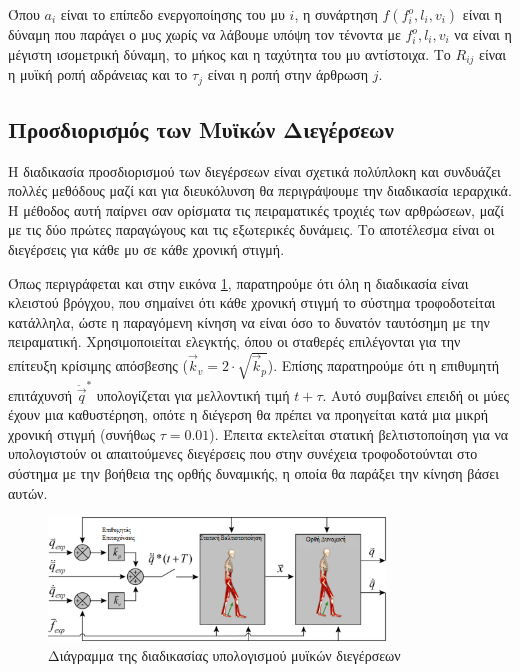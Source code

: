 Όπου $a_i$ είναι το επίπεδο ενεργοποίησης του μυ $i$, η συνάρτηση $f(f^{o}_{i}, l_{i}, v_{i})$ είναι η δύναμη που παράγει ο μυς χωρίς να λάβουμε υπόψη τον τένοντα με $f^{o}_{i}, l_{i}, v_{i}$ να είναι η μέγιστη ισομετρική δύναμη, το μήκος και η ταχύτητα του μυ αντίστοιχα. Το $R_{ij}$ είναι η μυϊκή ροπή αδράνειας και το $\tau_{j}$ είναι η ροπή στην άρθρωση $j$.

\subsection{Προσδιορισμός των Μυϊκών Διεγέρσεων}

Η διαδικασία προσδιορισμού των διεγέρσεων είναι σχετικά πολύπλοκη και συνδυάζει πολλές μεθόδους μαζί και για διευκόλυνση θα περιγράψουμε την διαδικασία ιεραρχικά. Η μέθοδος αυτή παίρνει σαν ορίσματα τις πειραματικές τροχιές των αρθρώσεων, μαζί με τις δύο πρώτες παραγώγους και τις εξωτερικές δυνάμεις. Το αποτέλεσμα είναι οι διεγέρσεις για κάθε μυ σε κάθε χρονική στιγμή.

Όπως περιγράφεται και στην εικόνα \ref{fig:cmc-diagram}, παρατηρούμε ότι όλη η διαδικασία είναι κλειστού βρόγχου, που σημαίνει ότι κάθε χρονική στιγμή το σύστημα τροφοδοτείται κατάλληλα, ώστε η παραγόμενη κίνηση να είναι όσο το δυνατόν ταυτόσημη με την πειραματική. Χρησιμοποιείται  ελεγκτής, όπου οι σταθερές επιλέγονται για την επίτευξη κρίσιμης απόσβεσης ($\overrightarrow{k}_v = 2 \cdot \sqrt{\overrightarrow{k}_p}$). Επίσης παρατηρούμε ότι η επιθυμητή επιτάχυνσή $\ddot{\overrightarrow{q}}^{*}$ υπολογίζεται για μελλοντική τιμή $t + \tau $. Αυτό συμβαίνει επειδή οι μύες έχουν μια καθυστέρηση, οπότε η διέγερση θα πρέπει να προηγείται κατά μια μικρή χρονική στιγμή (συνήθως $\tau = 0.01$). Έπειτα εκτελείται στατική βελτιστοποίηση για να υπολογιστούν οι απαιτούμενες διεγέρσεις που στην συνέχεια τροφοδοτούνται στο σύστημα με την βοήθεια της ορθής δυναμικής, η οποία θα παράξει την κίνηση βάσει αυτών.

\begin{figure}[H]
    \centering
    \includegraphics[width=0.8\textwidth, keepaspectratio]{fig/cmc-diagram.png}
    \caption{Διάγραμμα της διαδικασίας υπολογισμού μυϊκών διεγέρσεων \cite{thelen06}}
    \label{fig:cmc-diagram}
\end{figure}

